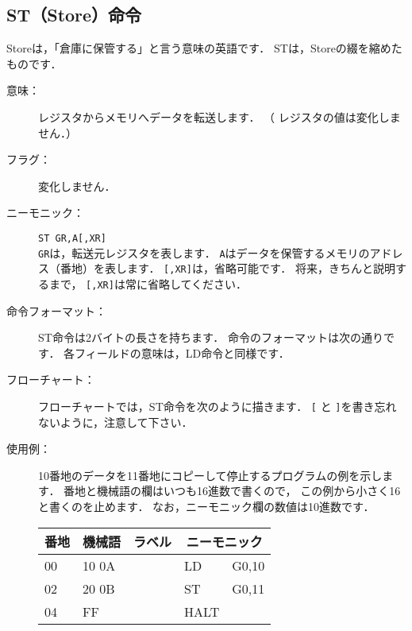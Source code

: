\newpage
\subsection{ST（Store）命令}
Storeは，「倉庫に保管する」と言う意味の英語です．
STは，Storeの綴を縮めたものです．

\begin{description}
\item[意味：]レジスタからメモリへデータを転送します．
（
レジスタの値は変化しません．） 

\item[フラグ：]変化しません．

\item[ニーモニック：]{\tt ST  GR,A[,XR]} \\
{\tt GR}は，転送元レジスタを表します．
{\tt A}はデータを保管するメモリのアドレス（番地）を表します．
{\tt [,XR]}は，省略可能です．
将来，きちんと説明するまで，
{\tt [,XR]}は常に省略してください．

\item[命令フォーマット：]ST命令は2バイトの長さを持ちます．
命令のフォーマットは次の通りです．
各フィールドの意味は，LD命令と同様です．


\item[フローチャート：]フローチャートでは，ST命令を次のように描きます．
{\tt [} と {\tt ]}を書き忘れないように，注意して下さい．

\begin{center}
\end{center}

\item[使用例：]
10番地のデータを11番地にコピーして停止するプログラムの例を示します．
番地と機械語の欄はいつも16進数で書くので，
この例から小さく16と書くのを止めます．
なお，ニーモニック欄の数値は10進数です．

{\tt\small\begin{center}
\begin{tabular}{|l|l|l|l l|} \hline
番地 & 機械語 & ラベル & \multicolumn{2}{|c|}{ニーモニック} \\
\hline
00 & 10 0A & & LD   & G0,10 \\
02 & 20 0B & & ST   & G0,11 \\
04 & FF    & & HALT & \\
\hline
\end{tabular}
\end{center}}
\end{description}

